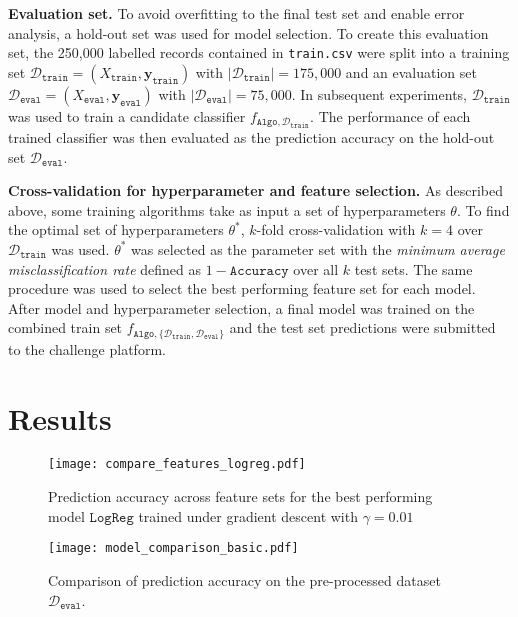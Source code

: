 \documentclass[10pt,conference,compsocconf]{IEEEtran}
\newcommand{\parabf}[1]{\vspace{1mm}\noindent\textbf{#1}}
\newcommand{\Deval}{\mathcal{D}_{\mathtt{eval}}}
\newcommand{\Dtrain}{\mathcal{D}_{\mathtt{train}}}
\newcommand{\Xtrain}{X_{\mathtt{train}}}
\newcommand{\ytrain}{\mathbf{y}_{\mathtt{train}}}
\newcommand{\Xeval}{X_{\mathtt{eval}}}
\newcommand{\yeval}{\mathbf{y}_{\mathtt{eval}}}
\newcommand{\classifier}[2]{f_{#1, #2}}
\newcommand{\Train}{\mathtt{Algo}}
\newcommand{\LogReg}{\mathtt{LogReg}}
\begin{document}
\parabf{Evaluation set.} To avoid overfitting to the final test set and enable error analysis, a hold-out set was used for model selection. To create this evaluation set, the 250,000 labelled records contained in \texttt{train.csv} were split into a training set $\Dtrain = (\Xtrain, \ytrain)$ with $|\Dtrain| = 175,000$ and an evaluation set $\Deval = (\Xeval, \yeval)$ with $|\Deval| = 75,000$. In subsequent experiments, $\Dtrain$ was used to train a candidate classifier $\classifier{\Train}{\Dtrain}$. The performance of each trained classifier was then evaluated as the prediction accuracy on the hold-out set $\Deval$.

\parabf{Cross-validation for hyperparameter and feature selection.} As described above, some training algorithms take as input a set of hyperparameters $\theta$. To find the optimal set of hyperparameters $\theta^*$, $k$-fold cross-validation with $k=4$ over $\Dtrain$ was used. $\theta^*$ was selected as the parameter set with the \emph{minimum average misclassification rate} defined as $1 - \mathtt{Accuracy}$ over all $k$ test sets. The same procedure was used to select the best performing feature set for each model.\\

After model and hyperparameter selection, a final model was trained on the combined train set
$\classifier{\Train}{\{ \Dtrain, \Deval\}}$ and the test set predictions were submitted to the challenge platform. 

\vspace*{-3.5mm}
\section{Results}
\label{sec:results}

\begin{figure}
	\texttt{[image: compare\_features\_logreg.pdf]}
	\caption{Prediction accuracy across feature sets for the best performing model $\LogReg$ trained under gradient descent with $\gamma = 0.01$}
	\label{fig:features}
	\setlength{\belowcaptionskip}{-10pt}
\end{figure}

\begin{figure}
	\texttt{[image: model\_comparison\_basic.pdf]}
	\caption{Comparison of prediction accuracy on the pre-processed dataset $\Deval$.}
	\label{fig:compare}
	\setlength{\belowcaptionskip}{-1pt}
	\vspace*{-5mm}
\end{figure}
\end{document}
